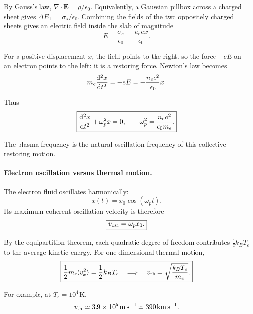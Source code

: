 \documentclass[11pt]{article}
\newcommand{\epsz}{\epsilon_0}
\begin{document}
By Gauss's law, $\nabla\cdot\mathbf E=\rho/\epsz$.
Equivalently, a Gaussian pillbox across a charged sheet gives
$\Delta E_\perp=\sigma_s/\epsz$.
Combining the fields of the two oppositely charged sheets gives
an electric field inside the slab of magnitude
\begin{equation}
E=\frac{\sigma_s}{\epsz}
=\frac{n_e e x}{\epsz}.
\end{equation}

For a positive displacement $x$, the field points to the right,
so the force $-eE$ on an electron points to the left:
it is a restoring force. Newton's law becomes
\begin{equation}
m_e\dv[2]{x}{t}
=-eE
=-\frac{n_e e^2}{\epsz}x.
\end{equation}

Thus
\begin{equation}
\boxed{
\dv[2]{x}{t}+\omega_p^2x=0,
\qquad
\omega_p^2=\frac{n_e e^2}{\epsz m_e}.
}
\end{equation}

The plasma frequency is the natural oscillation frequency of
this collective restoring motion.

\paragraph{Electron oscillation versus thermal motion.}

The electron fluid oscillates harmonically:
\begin{equation}
x(t)=x_0\cos(\omega_p t).
\end{equation}
Its maximum coherent oscillation velocity is therefore
\begin{equation}
\boxed{v_{\rm osc}=\omega_p x_0.}
\end{equation}

By the equipartition theorem, each quadratic degree of freedom
contributes $\frac{1}{2}k_B T_e$ to the average kinetic energy.
For one-dimensional thermal motion,
\begin{equation}
\boxed{
\frac{1}{2}m_e\langle v_x^2\rangle
=\frac{1}{2}k_B T_e
\quad\Longrightarrow\quad
v_{\rm th}=\sqrt{\frac{k_B T_e}{m_e}}.
}
\end{equation}


For example, at $T_e=10^4\,\mathrm{K}$,
\begin{equation}
v_{\rm th}\simeq 3.9\times10^5\,
\mathrm{m\,s^{-1}}
\simeq 390\,\mathrm{km\,s^{-1}}.
\end{equation}
\end{document}
